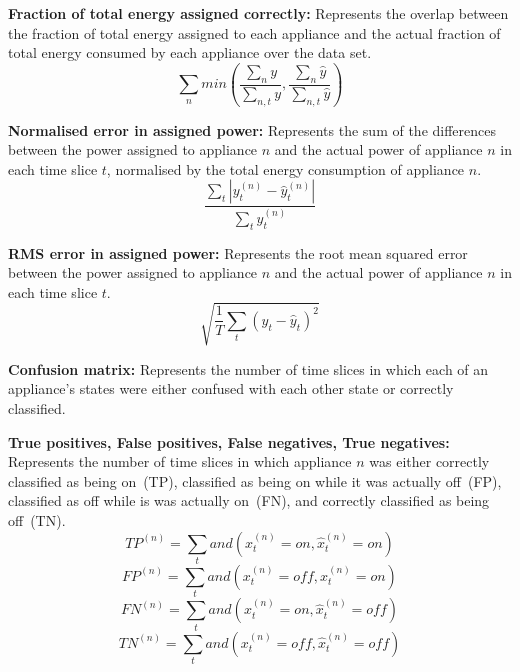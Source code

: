 \documentclass{sig-alternate}
\begin{document}
\textbf{Fraction of total energy assigned correctly:} Represents the overlap between the fraction of total energy assigned to each appliance and the actual fraction of total energy consumed by each appliance over the data set.
\begin{equation}
        \sum_n min \left ( 
        \frac{\sum_n y}{\sum_{n,t} y}, 
        \frac{\sum_n \hat{y}}{\sum_{n,t} \hat{y}} 
        \right )
\end{equation}

\textbf{Normalised error in assigned power:} Represents the sum of the differences between the power assigned to appliance $n$ and the actual power of appliance $n$ in each time slice $t$, normalised by the total energy consumption of appliance $n$.
\begin{equation}
        \frac
        { \sum_t {\left | y_t^{(n)} - \hat{y}_t^{(n)} \right |} }
        { \sum_t y_t^{(n)} }
\end{equation}

\textbf{RMS error in assigned power:} Represents the root mean squared error between the power assigned to appliance $n$ and the actual power of appliance $n$ in each time slice $t$.
\begin{equation}
\sqrt{ \frac{1}{T} \sum_t{ \left ( y_t - \hat{y}_t \right )^2 } }
\end{equation}

\textbf{Confusion matrix:} Represents the number of time slices in which each of an appliance's states were either confused with each other state or correctly classified.

\textbf{True positives, False positives, False negatives, True negatives:} Represents the number of time slices in which appliance $n$ was either correctly classified as being on~(TP), classified as being on while it was actually off~(FP), classified as off while is was actually on~(FN), and correctly classified as being off~(TN).
\begin{equation}
TP^{(n)} = 
\sum_{t}
and \left ( x^{(n)}_t = on, \hat{x}^{(n)}_t = on \right )
\end{equation}
\begin{equation}
FP^{(n)} = 
\sum_{t}
and \left ( x^{(n)}_t = off, \hat{x}^{(n)}_t = on \right )
\end{equation}
\begin{equation}
FN^{(n)} = 
\sum_{t}
and \left ( x^{(n)}_t = on, \hat{x}^{(n)}_t = off \right )
\end{equation}
\begin{equation}
TN^{(n)} = 
\sum_{t}
and \left ( x^{(n)}_t = off, \hat{x}^{(n)}_t = off \right )
\end{equation}
\end{document}

